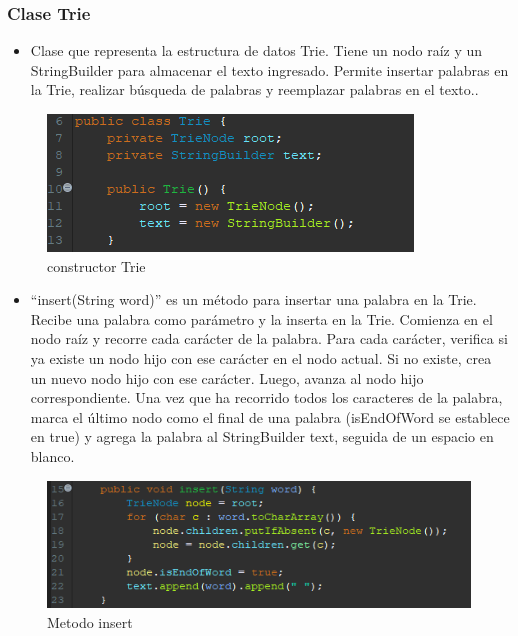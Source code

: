 \documentclass{article}
\begin{document}
  \subsubsection{Clase Trie}
   \begin{itemize}
       \item Clase que representa la estructura de datos Trie. Tiene un nodo raíz y un StringBuilder para almacenar el texto ingresado. Permite insertar palabras en la Trie, realizar búsqueda de palabras y reemplazar palabras en el texto..
   \end{itemize}
   \begin{figure}[H]
       \centering
       \includegraphics{img/img9.png}
       \caption{constructor Trie}
       \label{fig:enter-label}
   \end{figure}
   \begin{itemize}
        \item “insert(String word)” es un método para insertar una palabra en la Trie. Recibe una palabra como parámetro y la inserta en la Trie. Comienza en el nodo raíz y recorre cada carácter de la palabra. Para cada carácter, verifica si ya existe un nodo hijo con ese carácter en el nodo actual. Si no existe, crea un nuevo nodo hijo con ese carácter. Luego, avanza al nodo hijo correspondiente. Una vez que ha recorrido todos los caracteres de la palabra, marca el último nodo como el final de una palabra (isEndOfWord se establece en true) y agrega la palabra al StringBuilder text, seguida de un espacio en blanco.
   \end{itemize}
   \begin{figure}[H]
       \centering
       \includegraphics{img/img10.png}
       \caption{Metodo insert}
       \label{fig:enter-label}
   \end{figure}
\end{document}

